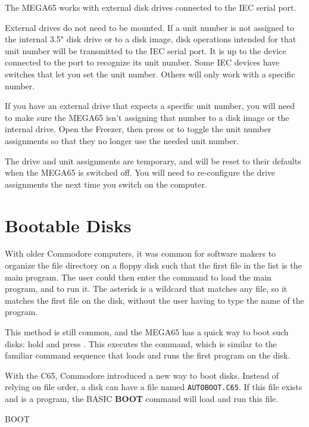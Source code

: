 The MEGA65 works with external disk drives connected to the IEC serial port.

External drives do not need to be mounted. If a unit number is not assigned to the internal 3.5" disk drive or to a disk image, disk operations intended for that unit number will be transmitted to the IEC serial port. It is up to the device connected to the port to recognize its unit number. Some IEC devices have switches that let you set the unit number. Others will only work with a specific number.

If you have an external drive that expects a specific unit number, you will need to make sure the MEGA65 isn't assigning that number to a disk image or the internal drive. Open the Freezer, then press  or  to toggle the unit number assignments so that they no longer use the needed unit number.

The drive and unit assignments are temporary, and will be reset to their defaults when the MEGA65 is switched off. You will need to re-configure the drive assignments the next time you switch on the computer.


\section{Bootable Disks}

With older Commodore computers, it was common for software makers to organize the file directory on a floppy disk such that the first file in the list is the main program. The user could then enter the command  to load the main program, and  to run it. The asterisk is a wildcard that matches any file, so it matches the first file on the disk, without the user having to type the name of the program.

This method is still common, and the MEGA65 has a quick way to boot such disks: hold  and press . This executes the  command, which is similar to the familiar command sequence that loads and runs the first program on the disk.

With the C65, Commodore introduced a new way to boot disks. Instead of relying on file order, a disk can have a file named {\tt AUTOBOOT.C65}. If this file exists and is a program, the BASIC {\bf BOOT} command will load and run this file.

\begin{screenoutput}
BOOT
\end{screenoutput}

